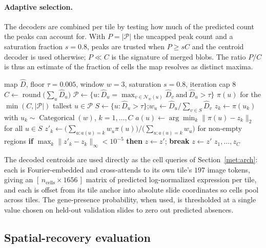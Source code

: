 \documentclass[11pt]{article}
\begin{document}
\paragraph{Adaptive selection.} The decoders are combined per tile by testing how
much of the predicted count the peaks can account for. With $P=|\mathcal{P}|$ the
uncapped peak count and a saturation fraction $s=0.8$, peaks are trusted when
$P\ge sC$ and the centroid decoder is used otherwise; $P\ll C$ is the signature
of merged blobs. The ratio $P/C$ is thus an estimate of the fraction of cells
the map resolves as distinct maxima.

\begin{algorithm}[!htbp]
\caption{Adaptive density decoding for one tile}
\begin{algorithmic}[1]
\Require map $\hat D$, floor $\tau=0.005$, window $w=3$, saturation $s=0.8$, iteration cap $8$
\State $C\gets\operatorname{round}\big(\sum_u \hat D_u\big)$ 
\State $\mathcal{P}\gets\{u:\hat D_u=\max_{v\in\mathcal{N}_w(u)}\hat D_v\ \text{and}\ \hat D_u>\tau\}$
  \State \Return $\pi(u)$ for the $\min(C,|\mathcal{P}|)$ tallest $u\in\mathcal{P}$ 
\EndIf
\State $S\gets\{u:\hat D_u>\tau\}$;\quad $w_u\gets \hat D_u/\sum_{v\in S}\hat D_v$
\State $z_k\gets\pi(u_k)$ with $u_k\sim\operatorname{Categorical}(w)$, $k=1,\dots,C$ 
  \State $a(u)\gets\arg\min_k\lVert\pi(u)-z_k\rVert_2$ for all $u\in S$
  \State $z'_k\gets\big(\sum_{u:a(u)=k}w_u\pi(u)\big)\big/\big(\sum_{u:a(u)=k}w_u\big)$ for non-empty regions
  \State \textbf{if} $\max_k\lVert z'_k-z_k\rVert_\infty<10^{-5}$ \textbf{then} $z\gets z'$; \textbf{break}
  \State $z\gets z'$
\EndFor
\State \Return $z_1,\dots,z_C$
\end{algorithmic}
\end{algorithm}

The decoded centroids are used directly as the cell queries of
Section~\ref{met:arch}: each is Fourier-embedded and cross-attends to its own
tile's $197$ image tokens, giving an
$[\,n_{\mathrm{cells}}\times1656\,]$ matrix of predicted log-normalized
expression per tile, and each is offset from its tile anchor into absolute slide
coordinates so cells pool across tiles. The gene-presence probability, when
used, is thresholded at a single value chosen on held-out validation slides to
zero out predicted absences.

\subsection{Spatial-recovery evaluation}
\label{met:recovery}
\end{document}
